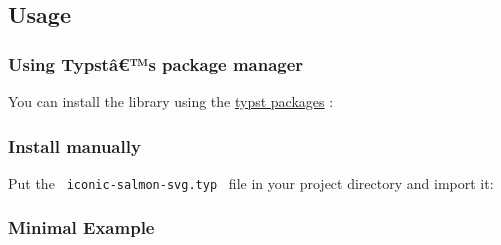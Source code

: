 \subsection{Usage}\label{usage}

\subsubsection{Using Typstâ€™s package
manager}\label{using-typstuxe2s-package-manager}

You can install the library using the
\href{https://github.com/typst/packages}{typst packages} :

\begin{Shaded}
\begin{Highlighting}[]
\end{Highlighting}
\end{Shaded}

\subsubsection{Install manually}\label{install-manually}

Put the \texttt{\ iconic-salmon-svg.typ\ } file in your project
directory and import it:

\begin{Shaded}
\begin{Highlighting}[]
\end{Highlighting}
\end{Shaded}

\subsubsection{Minimal Example}\label{minimal-example}

\begin{Shaded}
\begin{Highlighting}[]

\end{Highlighting}
\end{Shaded}

